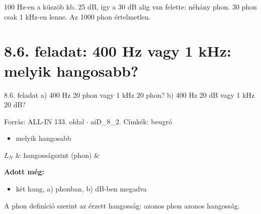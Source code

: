100 Hz-en a küszöb kb. 25 dB, így a 30 dB alig van felette: néhány phon. 30 phon csak 1 kHz-en lenne. Az 1000 phon értelmetlen.

\begin{center}\end{center}
\begin{eredmeny}

\begin{center}\end{center}
\end{eredmeny}


\section{\texorpdfstring{8.6. feladat: 400 Hz vagy 1 kHz: melyik hangosabb?}{8.6. feladat: 400 Hz vagy 1 kHz: melyik hangosabb?}}\label{ai8_06}
\setcounter{lepes}{0}
\begin{feladat}{8.6. feladat}
a) 400 Hz 20 phon vagy 1 kHz 20 phon? b) 400 Hz 20 dB vagy 1 kHz 20 dB?

{\footnotesize\sffamily Forrás: ALL-IN 133. oldal $\cdot$ aiD\_8\_2. Címkék: beugró}
\end{feladat}
\begin{keresunk}
\begin{itemize}
\item melyik hangosabb
\end{itemize}
\end{keresunk}
\begin{jeloles}
\begin{jeltabla}
$L_N$ & hangosságszint (phon) & \\
\end{jeltabla}
\par\smallskip\textbf{Adott még:}
\begin{itemize}
\item két hang, a) phonban, b) dB-ben megadva
\end{itemize}
\end{jeloles}

A phon definíció szerint az érzett hangosság: azonos phon azonos hangosság.

\begin{center}\end{center}

